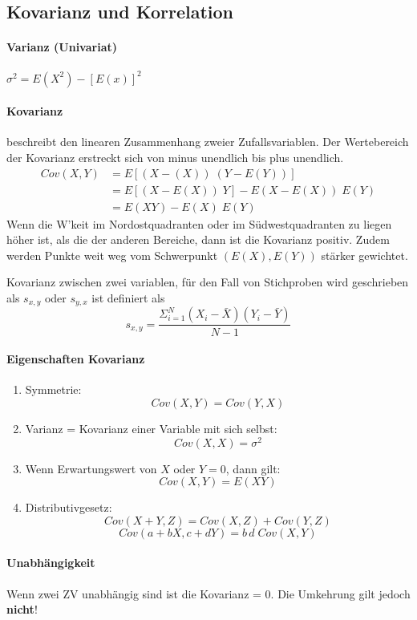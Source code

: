 \documentclass[a3paper, 8pt]{extarticle}
\begin{document}
\begin{multicols*}{5}
\subsection{Kovarianz und Korrelation}

 \paragraph{Varianz (Univariat)} $ \sigma^2 = E(X^2) - [E(x)]^2$


\paragraph{Kovarianz} beschreibt den linearen Zusammenhang zweier Zufallsvariablen. Der Wertebereich der Kovarianz erstreckt sich von minus unendlich bis plus unendlich.
\vspace{-3pt}
\begin{align*}
    Cov(X,Y) &= E[(X-(X))\;(Y-E(Y))]\\
    &= E[(X-E(X))\;Y]-E(X-E(X))\;E(Y)\\
    &= E(XY)-E(X)\;E(Y)
\end{align*}
Wenn die W’keit im Nordostquadranten oder im Südwestquadranten zu liegen höher ist, als die der anderen Bereiche, dann ist die Kovarianz positiv. Zudem werden Punkte weit
weg vom Schwerpunkt $(E(X), E(Y))$ stärker gewichtet.

Kovarianz zwischen zwei variablen, für den Fall von Stichproben wird geschrieben als $s_{x,y}$ oder $s_{y,x}$ ist definiert als \[s_{x,y}=\frac{\Sigma_{i=1}^N(X_i-\bar{X})(Y_i-\bar{Y})}{N-1}\]
\paragraph{Eigenschaften Kovarianz}
\begin{enumerate}
    \item Symmetrie: $$Cov(X, Y) = Cov(Y, X)$$
    \item Varianz = Kovarianz einer Variable mit sich selbst: $$Cov(X, X) = \sigma^2$$
    \item Wenn Erwartungswert von $X$ oder $Y = 0$, dann gilt: $$Cov(X, Y) = E(XY)$$
    \item Distributivgesetz: $$Cov(X + Y, Z) = Cov(X, Z) + Cov(Y, Z)$$
 $$Cov(a+bX,c+dY)=b\,d\;Cov(X,Y)$$
\end{enumerate}
 \vspace{5pt}

\paragraph{Unabhängigkeit} Wenn zwei ZV unabhängig sind ist die Kovarianz = 0. Die Umkehrung gilt jedoch \textbf{nicht}!


\end{multicols*}
\end{document}
